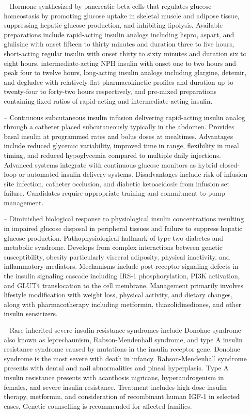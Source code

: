 -- Hormone synthesized by pancreatic beta cells that regulates glucose homeostasis by promoting glucose uptake in skeletal muscle and adipose tissue, suppressing hepatic glucose production, and inhibiting lipolysis. Available preparations include rapid-acting insulin analogs including lispro, aspart, and glulisine with onset fifteen to thirty minutes and duration three to five hours, short-acting regular insulin with onset thirty to sixty minutes and duration six to eight hours, intermediate-acting NPH insulin with onset one to two hours and peak four to twelve hours, long-acting insulin analogs including glargine, detemir, and degludec with relatively flat pharmacokinetic profiles and duration up to twenty-four to forty-two hours respectively, and pre-mixed preparations containing fixed ratios of rapid-acting and intermediate-acting insulin.

-- Continuous subcutaneous insulin infusion delivering rapid-acting insulin analog through a catheter placed subcutaneously typically in the abdomen. Provides basal insulin at programmed rates and bolus doses at mealtimes. Advantages include reduced glycemic variability, improved time in range, flexibility in meal timing, and reduced hypoglycemia compared to multiple daily injections. Advanced systems integrate with continuous glucose monitors as hybrid closed-loop or automated insulin delivery systems. Disadvantages include risk of infusion site infection, catheter occlusion, and diabetic ketoacidosis from infusion set failure. Candidates require appropriate training and commitment to pump management.

-- Diminished biological response to physiological insulin concentrations resulting in impaired glucose disposal in peripheral tissues and failure to suppress hepatic glucose production. Pathophysiological hallmark of type two diabetes and metabolic syndrome. Develops from complex interactions between genetic susceptibility, obesity particularly visceral adiposity, physical inactivity, and inflammatory mediators. Mechanisms include post-receptor signaling defects in the insulin signaling cascade including IRS-1 phosphorylation, PI3K activation, and GLUT4 translocation to the cell membrane. Management primarily involves lifestyle modification with weight loss, physical activity, and dietary changes, along with pharmacotherapy including metformin, thiazolidinediones, and other insulin sensitizers.

-- Rare inherited severe insulin resistance syndromes include Donohue syndrome also known as leprechaunism, Rabson-Mendenhall syndrome, and type A insulin resistance syndrome caused by mutations in the insulin receptor gene. Donohue syndrome is the most severe with death in infancy. Rabson-Mendenhall syndrome presents with dental and nail abnormalities and pineal hyperplasia. Type A insulin resistance presents with acanthosis nigricans, hyperandrogenism in females, and severe insulin resistance. Treatment includes high-dose insulin therapy, metformin, and consideration of recombinant human IGF-1 in selected cases. Genetic counselling is recommended for affected families.

